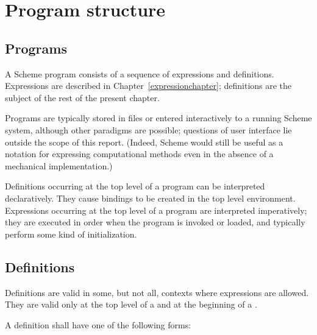 \chapter{Program structure}
\label{programchapter}

\section{Programs}

A Scheme program consists of a sequence of expressions and definitions.
Expressions are described in Chapter~\ref{expressionchapter};
definitions are the subject of the rest of the present chapter.

Programs are typically stored in files or entered interactively to a
running Scheme system, although other paradigms are possible;
questions of user interface lie outside the scope of this report.
(Indeed, Scheme would still be useful as a notation for expressing
computational methods even in the absence of a mechanical
implementation.)

Definitions occurring at the top level of a program can be interpreted
declaratively.  They cause bindings to be created in the top level
environment.  Expressions occurring at the top level of a program are
interpreted imperatively; they are executed in order when the program is
invoked or loaded, and typically perform some kind of initialization.



\section{Definitions}
\label{definitionsection}

Definitions are valid in some, but not all, contexts where expressions
are allowed.  They are valid only at the top level of a 
and at the beginning of a .

A definition shall have one of the following forms:

